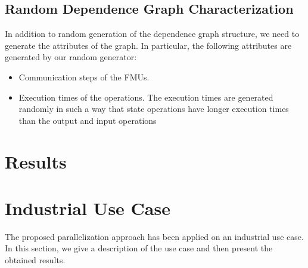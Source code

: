 \subsection{Random Dependence Graph Characterization}

In addition to random generation of the dependence graph structure, we need to generate the attributes of the graph. In particular, the following attributes are generated by our random generator:
\begin{itemize}
\item Communication steps of the FMUs.
\item Execution times of the operations. The execution times are generated randomly in such a way that state operations have longer execution times than the output and input operations
\end{itemize}

\section{Results}

\section{Industrial Use Case}

The proposed parallelization approach has been applied on an industrial use case. In this section, we give a description of the use case and then present the obtained results. 

